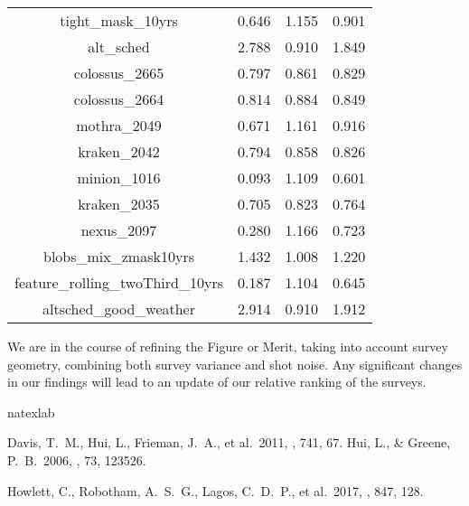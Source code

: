 \documentclass{aastex62}   	%
\begin{document}
\begin{table}
\begin{tabular}{|c|rrr|}
tight\_mask\_10yrs  & 0.646 & 1.155 & 0.901  \\
alt\_sched  & 2.788 & 0.910 & 1.849  \\
colossus\_2665  & 0.797 & 0.861 & 0.829  \\
colossus\_2664  & 0.814 & 0.884 & 0.849  \\
mothra\_2049  & 0.671 & 1.161 & 0.916  \\
kraken\_2042  & 0.794 & 0.858 & 0.826  \\
minion\_1016  & 0.093 & 1.109 & 0.601  \\
kraken\_2035  & 0.705 & 0.823 & 0.764  \\
nexus\_2097  & 0.280 & 1.166 & 0.723  \\
blobs\_mix\_zmask10yrs  & 1.432 & 1.008 & 1.220  \\
feature\_rolling\_twoThird\_10yrs  & 0.187 & 1.104 & 0.645  \\
altsched\_good\_weather  & 2.914 & 0.910 & 1.912  \\
\hline
\end{tabular}
\end{table}

We are in the course of refining the Figure or Merit, taking into account survey geometry, combining both survey variance and shot noise.
Any significant changes in our findings will lead to an update of our relative
ranking of the surveys.


\begin{thebibliography}{}
\expandafter\ifx\csname natexlab\endcsname\relax\def\natexlab#1{#1}\fi
\providecommand{\url}[1]{\href{#1}{#1}}
\providecommand{\dodoi}[1]{doi:~\href{http://doi.org/#1}{\nolinkurl{#1}}}
\providecommand{\doeprint}[1]{\href{http://ascl.net/#1}{\nolinkurl{http://ascl.net/#1}}}
\providecommand{\doarXiv}[1]{\href{https://arxiv.org/abs/#1}{\nolinkurl{https://arxiv.org/abs/#1}}}

 Davis, T.~M., Hui, L., Frieman, J.~A., et al.\ 2011, \apj, 741, 67.  
 Hui, L., \& Greene, P.~B.\ 2006, \prd, 73, 123526.
  
 Howlett, C., Robotham, A.~S.~G., Lagos, C.~D.~P., et al.\ 2017, \apj, 847, 128.
\end{thebibliography}

\end{document}
